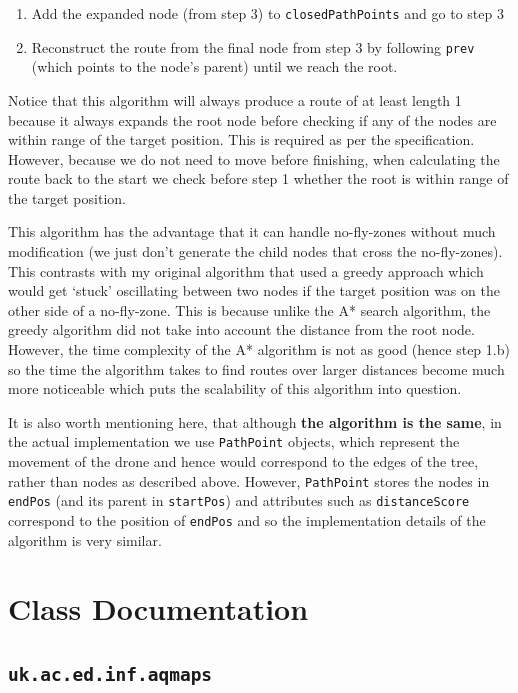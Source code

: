 \documentclass[11pt]{article}
\begin{document}
\begin{enumerate}[topsep=0pt, itemsep=0pt]
  \item Add the expanded node (from step 3) to \texttt{closedPathPoints} and go to step 3

  \item Reconstruct the route from the final node from step 3 by following \texttt{prev} (which points to the node's parent) until we reach the root.
\end{enumerate}

Notice that this algorithm will always produce a route of at least length 1 because it always expands the root node before checking if any of the nodes are within range of the target position. This is required as per the specification. However, because we do not need to move before finishing, when calculating the route back to the start we check before step 1 whether the root is within range of the target position.

This algorithm has the advantage that it can handle no-fly-zones without much modification (we just don't generate the child nodes that cross the no-fly-zones). This contrasts with my original algorithm that used a greedy approach which would get `stuck' oscillating between two nodes if the target position was on the other side of a no-fly-zone. This is because unlike the A* search algorithm, the greedy algorithm did not take into account the distance from the root node. However, the time complexity of the A* algorithm is not as good (hence step 1.b) so the time the algorithm takes to find routes over larger distances become much more noticeable which puts the scalability of this algorithm into question.

It is also worth mentioning here, that although \textbf{the algorithm is the same}, in the actual implementation we use \texttt{PathPoint} objects, which represent the movement of the drone and hence would correspond to the edges of the tree, rather than nodes as described above. However, \texttt{PathPoint} stores the nodes in \texttt{endPos} (and its parent in \texttt{startPos}) and attributes such as \texttt{distanceScore} correspond to the position of \texttt{endPos} and so the implementation details of the algorithm is very similar.

\section{Class Documentation}

\subsection{\texttt{uk.ac.ed.inf.aqmaps}}
\end{document}
